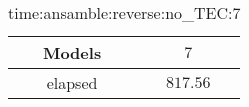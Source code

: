 \begin{table}[!ht]
	\centering
	\begin{tabular}{|c|c|}
		\hline
		Models & $7$ \\ \hline
		elapsed & $817.56$ \\ \hline
	\end{tabular}
	\caption{time:ansamble:reverse:no_TEC:7}
	\label{tab:time:ansamble:reverse:no_TEC:7}
\end{table}
